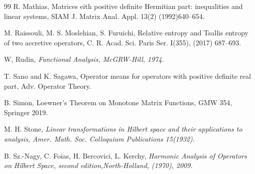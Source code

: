 \documentclass[reqno]{amsart}
\theoremstyle{definition}
\theoremstyle{remark}
\begin{document}
\begin{thebibliography}{99}
R. Mathias, Matrices eith positive definite Hermitian part: inequalities and linear systems, SIAM J. 
Matrix Anal. Appl. 13(2) (1992)640--654.

 
 
%
%
%
M. Raissouli, M. S. Moslehian, S. Furuichi, Relative entropy and Tsallis entropy of two accretive operators, C. R. Acad. Sci. Paris Ser. I(355), (2017) 687--693.

W, Rudin, \it Functional Analysis, \rm McGRW-Hill, 1974. 
  
T. Sano and K. Sagawa, Operator means for operators with positive definite real part, 
Adv. Operator Theory. 


B. Simon, Loewner's Theorem on Monotone Matrix Functions, GMW 354, Springer 
2019.

M. H. Stone, \it Linear transformations in Hilbert space and their applications to 
analysis, \rm Amer. Math. Soc. Colloquium Publications 15(1932). 


 
B. Sz.-Nagy,  C. Foias, H. Bercovici, L. Kerchy, \it Harmonic Analysis of Operators on Hilbert Space, second edition,\rm North-Holland, (1970),  2009.


\end{thebibliography}
\end{document}
